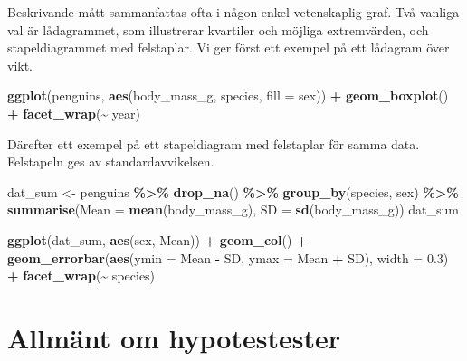 \documentclass[
]{book}
\newenvironment{Shaded}{\begin{snugshade}}{\end{snugshade}}
\newcommand{\AttributeTok}[1]{\textcolor[rgb]{0.13,0.29,0.53}{#1}}
\newcommand{\FloatTok}[1]{\textcolor[rgb]{0.00,0.00,0.81}{#1}}
\newcommand{\FunctionTok}[1]{\textcolor[rgb]{0.13,0.29,0.53}{\textbf{#1}}}
\newcommand{\NormalTok}[1]{#1}
\newcommand{\OtherTok}[1]{\textcolor[rgb]{0.56,0.35,0.01}{#1}}
\newcommand{\SpecialCharTok}[1]{\textcolor[rgb]{0.81,0.36,0.00}{\textbf{#1}}}
\theoremstyle{definition}
\theoremstyle{definition}
\theoremstyle{definition}
\theoremstyle{definition}
\theoremstyle{remark}
\begin{document}
Beskrivande mått sammanfattas ofta i någon enkel vetenskaplig graf. Två vanliga val är lådagrammet, som illustrerar kvartiler och möjliga extremvärden, och stapeldiagrammet med felstaplar. Vi ger först ett exempel på ett lådagram över vikt.

\begin{Shaded}
\begin{Highlighting}[]
\FunctionTok{ggplot}\NormalTok{(penguins, }\FunctionTok{aes}\NormalTok{(body\_mass\_g, species, }\AttributeTok{fill =}\NormalTok{ sex)) }\SpecialCharTok{+}
  \FunctionTok{geom\_boxplot}\NormalTok{() }\SpecialCharTok{+}
  \FunctionTok{facet\_wrap}\NormalTok{(}\SpecialCharTok{\textasciitilde{}}\NormalTok{ year)}
\end{Highlighting}
\end{Shaded}

Därefter ett exempel på ett stapeldiagram med felstaplar för samma data. Felstapeln ges av standardavvikelsen.

\begin{Shaded}
\begin{Highlighting}[]
\NormalTok{dat\_sum }\OtherTok{\textless{}{-}}\NormalTok{ penguins }\SpecialCharTok{\%\textgreater{}\%} 
  \FunctionTok{drop\_na}\NormalTok{() }\SpecialCharTok{\%\textgreater{}\%} 
  \FunctionTok{group\_by}\NormalTok{(species, sex) }\SpecialCharTok{\%\textgreater{}\%} 
  \FunctionTok{summarise}\NormalTok{(}\AttributeTok{Mean =} \FunctionTok{mean}\NormalTok{(body\_mass\_g),}
            \AttributeTok{SD =} \FunctionTok{sd}\NormalTok{(body\_mass\_g))}
\NormalTok{dat\_sum}

\FunctionTok{ggplot}\NormalTok{(dat\_sum, }\FunctionTok{aes}\NormalTok{(sex, Mean)) }\SpecialCharTok{+}
  \FunctionTok{geom\_col}\NormalTok{() }\SpecialCharTok{+}
  \FunctionTok{geom\_errorbar}\NormalTok{(}\FunctionTok{aes}\NormalTok{(}\AttributeTok{ymin =}\NormalTok{ Mean }\SpecialCharTok{{-}}\NormalTok{ SD, }\AttributeTok{ymax =}\NormalTok{ Mean }\SpecialCharTok{+}\NormalTok{ SD), }
                \AttributeTok{width =} \FloatTok{0.3}\NormalTok{) }\SpecialCharTok{+}
  \FunctionTok{facet\_wrap}\NormalTok{(}\SpecialCharTok{\textasciitilde{}}\NormalTok{ species)}
\end{Highlighting}
\end{Shaded}

\section{Allmänt om hypotestester}\label{allmuxe4nt-om-hypotestester}
\end{document}
